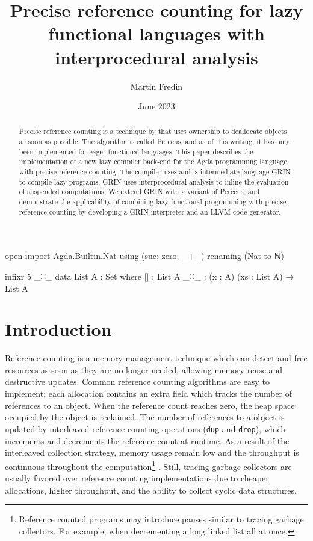 \documentclass[10pt, twocolumn]{article}
\title{ Precise reference counting for lazy functional languages with interprocedural analysis}
\author{Martin Fredin}
\date{June 2023}
\begin{document}
\maketitle


\begin{code}[hide]
open import Agda.Builtin.Nat using (suc; zero; _+_) renaming (Nat to ℕ) 

infixr 5 _∷_
data List A : Set where
  []  : List A
  _∷_ : (x : A) (xs : List A) → List A
\end{code}

\begin{abstract}
Precise reference counting is a technique by \citeauthor{reinking2021} that uses ownership to deallocate objects as soon as possible. 
The algorithm is called Perceus, and as of this writing, it has only been implemented for eager functional languages.
This paper describes the implementation of a new lazy compiler back-end for the Agda programming language with 
precise reference counting. 
The compiler uses \citeauthor{boquist1999} and \citeauthor{johnsson1991}'s intermediate language GRIN to compile lazy programs. 
GRIN uses interprocedural analysis to inline the evaluation of suspended computations.
We extend GRIN with a variant of Perceus, and demonstrate the applicability of combining lazy functional programming with precise reference counting by developing a GRIN interpreter and an LLVM code generator. 

\end{abstract}

\section{Introduction}

Reference counting \citep{collins1960} is a memory management technique which can detect and free resources as soon as they are no longer needed, allowing memory reuse and destructive updates. 
Common reference counting algorithms are easy to implement; each allocation contains an extra field which tracks the number of references to an object. 
When the reference count reaches zero, the heap space occupied by the object is reclaimed.
The number of references to a object is updated by interleaved reference counting operations (\texttt{dup} and \texttt{drop}), which increments and decrements the reference count at runtime. 
As a result of the interleaved collection strategy, memory usage remain low and the throughput is continuous throughout the computation\footnote{Reference counted programs may introduce pauses similar to tracing garbage collectors. For example, when decrementing a long linked list all at once.} \citep{jones1996}.
Still, tracing garbage collectors are usually favored over reference counting implementations due to cheaper allocations, higher throughput, and the ability to collect cyclic data structures.
\end{document}
